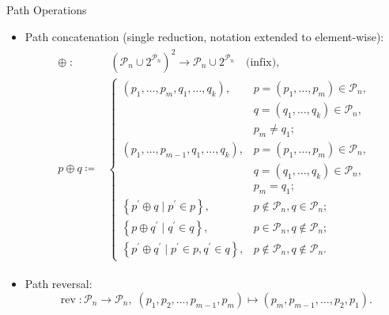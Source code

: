 \documentclass[
  size=8pt,
  style=klope,
  paper=screen,
  pauseslide,
  nopagebreaks,
  hlsections,
  fleqn
]{powerdot}
\begin{document}
\begin{slide}[toc=]{Path Operations}
\begin{itemize}
  \item
  Path concatenation (single reduction, notation extended to element-wise):
  \begin{align}
    \begin{split}
    \oplus \; : & \; {\left( \mathcal{P}_n \cup 2^{\mathcal{P}_n} \right)}^2 \to \mathcal{P}_n \cup 2^{\mathcal{P}_n} \quad \text{(infix)},
    \\
    p \oplus q \coloneqq &
    \begin{cases}
      \left(p_1,\ldots,p_m,q_1,\ldots,q_k\right),
      & p = \left(p_1,\ldots,p_m\right) \in \mathcal{P}_n, \\
      & q = \left(q_1,\ldots,q_k\right) \in \mathcal{P}_n, \\
      & p_m \neq q_1;
      \\
      \left(p_1,\ldots,p_{m-1},q_1,\ldots,q_k\right),
      & p = \left(p_1,\ldots,p_m\right) \in \mathcal{P}_n, \\
      & q = \left(q_1,\ldots,q_k\right) \in \mathcal{P}_n, \\
      & p_m = q_1;
      \\
      \left\{p^\prime \oplus q \; \vert \; p^\prime \in p\right\},
      & p \notin \mathcal{P}_n, q \in \mathcal{P}_n;
      \\
      \left\{p \oplus q^\prime \; \vert \; q^\prime \in q\right\},
      & p \in \mathcal{P}_n, q \notin \mathcal{P}_n;
      \\
      \left\{p^\prime \oplus q^\prime \; \vert \; p^\prime \in p, q^\prime \in q\right\},
      & p \notin \mathcal{P}_n, q \notin \mathcal{P}_n.
    \end{cases}
    \end{split}
  \end{align}%
  \item Path reversal:
    \begin{equation}
      \operatorname{rev} : \mathcal{P}_n \to \mathcal{P}_n, \;
      \left(p_1,p_2,\ldots,p_{m-1},p_m\right) \mapsto \left(p_m,p_{m-1},\ldots,p_2,p_1\right).
    \end{equation}
\end{itemize}
\end{slide}
\end{document}
